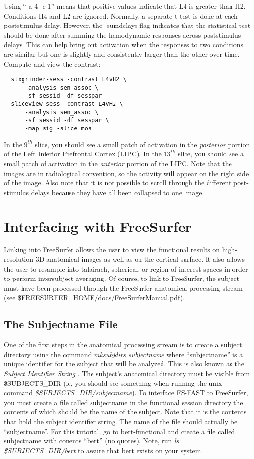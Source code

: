 \documentclass[12pt]{article}
\begin{document}
Using ``-a 4 -c 1'' means that positive values indicate that L4 is
greater than H2. Conditions H4 and L2 are ignored.  Normally, a
separate t-test is done at each poststimulus delay. However, the
-sumdelays flag indicates that the statistical test should be done
after summing the hemodynamic responses across poststimulus
delays. This can help bring out activation when the responses to two
conditions are similar but one is slightly and consistently larger
than the other over time. Compute and view the contrast:
\begin{verbatim}
  stxgrinder-sess -contrast L4vH2 \
      -analysis sem_assoc \
      -sf sessid -df sesspar 
  sliceview-sess -contrast L4vH2 \
      -analysis sem_assoc \
      -sf sessid -df sesspar \
      -map sig -slice mos 
\end{verbatim}
In the $9^{th}$ slice, you should see a small patch of activation in
the {\em posterior} portion of the Left Inferior Prefrontal Cortex
(LIPC).  In the $13^{th}$ slice, you should see a small patch of
activation in the {\em anterior} portion of the LIPC.  Note that the
images are in radiological convention, so the activity will appear on
the right side of the image. Also note that it is not possible to
scroll through the different post-stimulus delays because they have
all been collapsed to one image.

\section{Interfacing with FreeSurfer}

Linking into FreeSurfer allows the user to view the functional results
on high-resolution 3D anatomical images as well as on the cortical
surface. It also allows the user to resample into talairach,
spherical, or region-of-interest spaces in order to perform
intersubject averaging. Of course, to link to FreeSurfer, the subject
must have been processed through the FreeSurfer anatomical processing
stream (see \$FREESURFER\_HOME/docs/FreeSurferManual.pdf). 

\subsection{The Subjectname File}

One of the first steps in the anatomical processing stream is to
create a subject directory using the command {\em mksubjdirs
subjectname} where ``subjectname'' is a unique identifier for the
subject that will be analyzed. This is also known as the {\em Subject
Identifier String }. The subject's anatomical directory must be
visible from \$SUBJECTS\_DIR (ie, you should see something when
running the unix command {\em \$SUBJECTS\_DIR/subjectname}). To
interface FS-FAST to FreeSurfer, you must create a file called
subjectname in the functional session directory the contents of which
should be the name of the subject. Note that it is the contents that
hold the subject identifier string. The name of the file should
actually be ``subjectname''. For this tutorial, go to bert-functional
and create a file called subjectname with conents ``bert'' (no
quotes). Note, run {\em ls \$SUBJECTS\_DIR/bert} to assure that bert
exists on your system.
\end{document}
